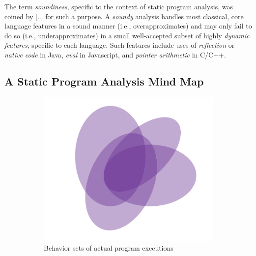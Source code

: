 The term \emph{soundiness}, specific to the context of static program analysis,
was coined by [..] for such a purpose. A \emph{soundy} analysis handles most
classical, core language features in a sound manner (i.e., overapproximates)
and may only fail to do so (i.e., underapproximates) in a small well-accepted
subset of highly \emph{dynamic features}, specific to each language. Such
features include uses of \emph{reflection} or \emph{native code} in Java,
\emph{eval} in Javascript, and \emph{pointer arithmetic} in C/C++.

\subsection{A Static Program Analysis Mind Map}

\begin{figure}[htb!]
\begin{subfigure}{.47\textwidth}
    \includegraphics[scale=.45]{assets/intro/venn-soundness-a.pdf}
    \caption{Behavior sets of actual program executions}
    \label{fig:intro:soundness-a}
\end{subfigure}
\hfill
\begin{subfigure}{.47\textwidth}

\end{subfigure}
\end{figure}
